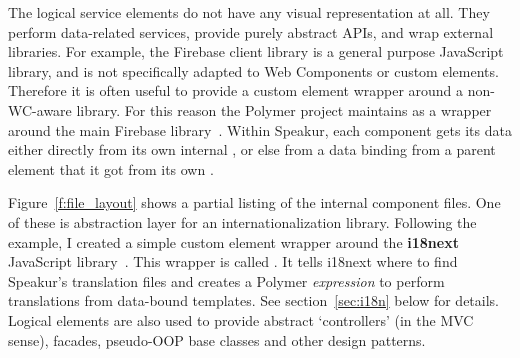 The logical service elements do not have any visual representation at all.
They perform data-related services, provide purely abstract APIs, and wrap external libraries.
For example, the Firebase client library is a general purpose JavaScript library, and is not specifically adapted to Web Components or custom elements.
Therefore it is often useful to provide a custom element wrapper around a non-WC-aware library.
For this reason the Polymer project maintains  as a wrapper around the main Firebase library~\cite{polymercontributors2015-c}.
Within Speakur, each component gets its data either directly from its own internal , or else from a data binding from a parent element that it got from its own .

Figure~\ref{f:file_layout} shows a partial listing of the internal component files.
One of these is abstraction layer for an internationalization library.
Following the  example, 
I created a simple custom element wrapper around the \textbf{i18next} 
JavaScript library~\cite{i18nextcontributors2015}.
This wrapper is called . 
It tells i18next where to find Speakur's translation files and creates a Polymer \textit{expression} to perform translations from data-bound templates. 
See section~\ref{sec:i18n} below for details.
Logical elements are also used to provide abstract `controllers' 
(in the MVC sense), 
facades, pseudo-OOP base classes and other design patterns.

